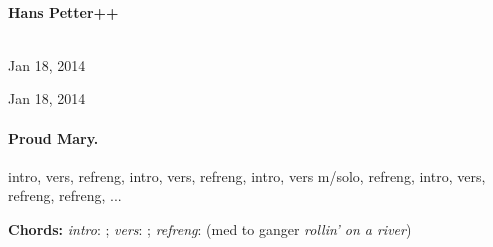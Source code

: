 \documentclass[%
twoside,                 %
final,                   %
10pt]{article}
\begin{document}
\begin{center}
\ \\ [2mm]


\author{Hans Petter++}

\author{Hans Petter++\inst{}}
\institute{}

\begin{center}
{\bf Hans Petter++${}^{}$} \\ [0mm]
\end{center}

\begin{center}
\end{center}


\date{Jan 18, 2014}
\maketitle
\date{Jan 18, 2014
}

\ \\ [10mm]
{\large\textsf{Jan 18, 2014}}

\end{center}
\vfill
\clearpage

\begin{center}
Jan 18, 2014
\end{center}

\vspace{1cm}





\vspace{1cm} %





\paragraph{Proud Mary.}
intro, vers, refreng, intro, vers, refreng, intro, vers m/solo, refreng,
intro, vers, refreng, refreng, ...

\textbf{Chords:} \emph{intro}: ;
\emph{vers}: ; \emph{refreng}:  (med to ganger \emph{rollin' on a river})
\end{document}
